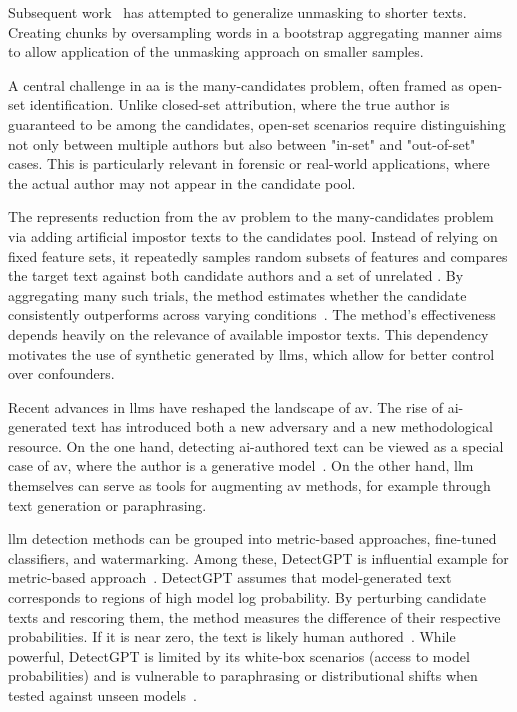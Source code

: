 Subsequent work~\citep{bevendorff_generalizing_2019,bevendorff_divergence_based_2020} has attempted to generalize unmasking to shorter texts. 
Creating chunks by oversampling words in a bootstrap aggregating manner aims to allow application of the unmasking approach on smaller samples. 

A central challenge in \ac{aa} is the many-candidates problem, often framed as open-set identification. 
Unlike closed-set attribution, where the true author is guaranteed to be among the candidates, open-set scenarios require distinguishing not only between multiple authors but also between "in-set" and "out-of-set" cases. 
This is particularly relevant in forensic or real-world applications, where the actual author may not appear in the candidate pool.

The \impAppr{} represents reduction from the \ac{av} problem to the many-candidates  problem via adding artificial impostor texts to the candidates pool. 
Instead of relying on fixed feature sets, it repeatedly samples random subsets of features and compares the target text against both candidate authors and a set of unrelated \imps{}. 
By aggregating many such trials, the method estimates whether the candidate consistently outperforms \imps{} across varying conditions~\citep{koppel_determining_2014}. 
The method's effectiveness depends heavily on the relevance of available impostor texts. 
This dependency motivates the use of synthetic \imps{} generated by \acp{llm}, which allow for better control over confounders.

Recent advances in \acp{llm} have reshaped the landscape of \ac{av}. 
The rise of \ac{ai}-generated text has introduced both a new adversary and a new methodological resource. 
On the one hand, detecting \ac{ai}-authored text can be viewed as a special case of \ac{av}, where the author is a generative model~\citep{bevendorff_overview_2024}. 
On the other hand, \ac{llm} themselves can serve as tools for augmenting \ac{av} methods, for example through text generation or paraphrasing.

\ac{llm} detection methods can be grouped into metric-based approaches, fine-tuned classifiers, and watermarking. 
Among these, DetectGPT is influential example for metric-based approach~\citep{wang_stumbling_2024}.
DetectGPT assumes that model-generated text corresponds to regions of high model log probability. 
By perturbing candidate texts and rescoring them, the method measures the difference of their respective probabilities.
If it is near zero, the text is likely human authored~\citep{mitchell_detectgpt_2023}. 
While powerful, DetectGPT is limited by its white-box scenarios (access to model probabilities) and is vulnerable to paraphrasing or distributional shifts when tested against unseen models~\citep{Wu_ODD_challenges_2025}.

